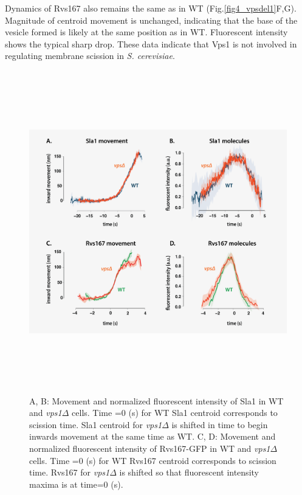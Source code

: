 \vspace{5mm}
Dynamics of Rvs167 also remains the same as in WT (Fig.\ref{fig4_vpsdel1}F,G). Magnitude of centroid movement is unchanged, indicating that the base of the vesicle formed is likely at the same position as in WT. Fluorescent intensity shows the typical sharp drop. These data indicate that Vps1 is not involved in regulating membrane scission in \textit{S. cerevisiae}.  


	\begin{figure}[H]
	\centering
	\includegraphics[width=14cm,height=14cm,keepaspectratio]{figures/results_final/vps2}
	\caption[Tracking endocytic proteins in \textit{vps1$\Delta$} cells]
	{A, B: Movement and normalized fluorescent intensity of Sla1 in WT and \textit{vps1$\Delta$} cells. Time =0 (s) for WT Sla1 centroid corresponds to scission time. Sla1 centroid for \textit{vps1$\Delta$} is shifted in time to begin inwards movement at the same time as WT. 
		C, D: Movement and normalized fluorescent intensity of Rvs167-GFP in WT and  \textit{vps1$\Delta$} cells. Time =0 (s) for WT Rvs167 centroid corresponds to scission time. Rvs167 for \textit{vps1$\Delta$} is shifted so that fluorescent intensity maxima is at time=0 (s).
		\label{fig4_vpsdel2}}
\end{figure}



